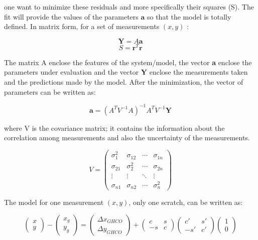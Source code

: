 \noindent one want to minimize these residuals and more specifically their squares (S). The fit will provide the values of the parameters $\textbf{a}$ so that the model is totally defined. In matrix form, for a set of measurements $(x,y)$ :

\begin{equation}
\textbf{Y}= A \textbf{a}
\end{equation}
\begin{equation}
S=\textbf{r}^T\textbf{r}
\end{equation}

The matrix A enclose the features of the system/model, the vector \textbf{a} enclose the parameters under evaluation and the vector \textbf{Y} enclose the measurements taken and the predictions made by the model. After the minimization, the vector of parameters can be written as:

\begin{equation}\label{solution}
\textbf{a}=(A^TV^{-1}A)^{-1}A^TV^{-1}\textbf{Y}
\end{equation}

\noindent where V is the covariance matrix; it contains the information about the correlation among measurements and also the uncertainty of the measurements.

\begin{equation}
  V=
  \begin{pmatrix}
    \sigma_1^2  & \sigma_{12}  & \cdots & \sigma_{1n} \\
    \sigma_{21} & \sigma_2^2   & \cdots & \sigma_{2n} \\
    \vdots      & \vdots       & \ddots & \vdots      \\
    \sigma_{n1} & \sigma_{n2}  & \cdots & \sigma_n^2
  \end{pmatrix}
\end{equation}

The model for one measurement $(x,y)$, \ie only one scratch, can be written as:

\begin{equation}
\begin{pmatrix}
x\\ 
y
\end{pmatrix}-
\begin{pmatrix}
x_g\\ 
y_g
\end{pmatrix}=
\begin{pmatrix}
\Delta x_{GHCO}\\ 
\Delta y_{GHCO}
\end{pmatrix}
+
\begin{pmatrix}
c  & s\\ 
-s & c
\end{pmatrix}
\begin{pmatrix}
c' & s' \\ 
-s'& c' 
\end{pmatrix}
\begin{pmatrix}
1\\ 
0
\end{pmatrix}
\end{equation}


